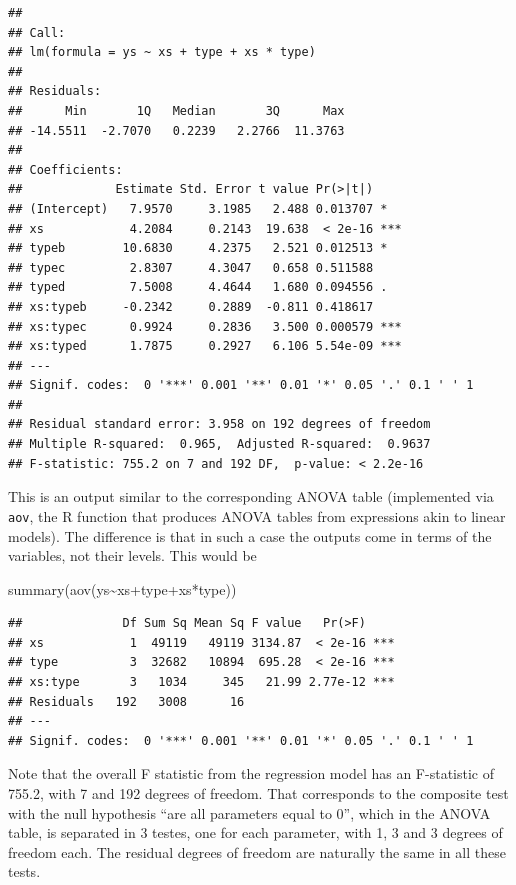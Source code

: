\documentclass[
]{book}
\newenvironment{Shaded}{\begin{snugshade}}{\end{snugshade}}
\newcommand{\FunctionTok}[1]{\textcolor[rgb]{0.00,0.00,0.00}{#1}}
\newcommand{\NormalTok}[1]{#1}
\newcommand{\SpecialCharTok}[1]{\textcolor[rgb]{0.00,0.00,0.00}{#1}}
\begin{document}
\begin{verbatim}
## 
## Call:
## lm(formula = ys ~ xs + type + xs * type)
## 
## Residuals:
##      Min       1Q   Median       3Q      Max 
## -14.5511  -2.7070   0.2239   2.2766  11.3763 
## 
## Coefficients:
##             Estimate Std. Error t value Pr(>|t|)    
## (Intercept)   7.9570     3.1985   2.488 0.013707 *  
## xs            4.2084     0.2143  19.638  < 2e-16 ***
## typeb        10.6830     4.2375   2.521 0.012513 *  
## typec         2.8307     4.3047   0.658 0.511588    
## typed         7.5008     4.4644   1.680 0.094556 .  
## xs:typeb     -0.2342     0.2889  -0.811 0.418617    
## xs:typec      0.9924     0.2836   3.500 0.000579 ***
## xs:typed      1.7875     0.2927   6.106 5.54e-09 ***
## ---
## Signif. codes:  0 '***' 0.001 '**' 0.01 '*' 0.05 '.' 0.1 ' ' 1
## 
## Residual standard error: 3.958 on 192 degrees of freedom
## Multiple R-squared:  0.965,  Adjusted R-squared:  0.9637 
## F-statistic: 755.2 on 7 and 192 DF,  p-value: < 2.2e-16
\end{verbatim}

This is an output similar to the corresponding ANOVA table (implemented via \texttt{aov}, the R function that produces ANOVA tables from expressions akin to linear models). The difference is that in such a case the outputs come in terms of the variables, not their levels. This would be

\begin{Shaded}
\begin{Highlighting}[]
\FunctionTok{summary}\NormalTok{(}\FunctionTok{aov}\NormalTok{(ys}\SpecialCharTok{\textasciitilde{}}\NormalTok{xs}\SpecialCharTok{+}\NormalTok{type}\SpecialCharTok{+}\NormalTok{xs}\SpecialCharTok{*}\NormalTok{type))}
\end{Highlighting}
\end{Shaded}

\begin{verbatim}
##              Df Sum Sq Mean Sq F value   Pr(>F)    
## xs            1  49119   49119 3134.87  < 2e-16 ***
## type          3  32682   10894  695.28  < 2e-16 ***
## xs:type       3   1034     345   21.99 2.77e-12 ***
## Residuals   192   3008      16                     
## ---
## Signif. codes:  0 '***' 0.001 '**' 0.01 '*' 0.05 '.' 0.1 ' ' 1
\end{verbatim}

Note that the overall F statistic from the regression model has an F-statistic of
755.2, with
7 and
192 degrees of freedom. That corresponds to the composite test with the null hypothesis ``are all parameters equal to 0'', which in the ANOVA table, is separated in 3 testes, one for each parameter, with 1, 3 and 3 degrees of freedom each. The residual degrees of freedom are naturally the same in all these tests.
\end{document}
